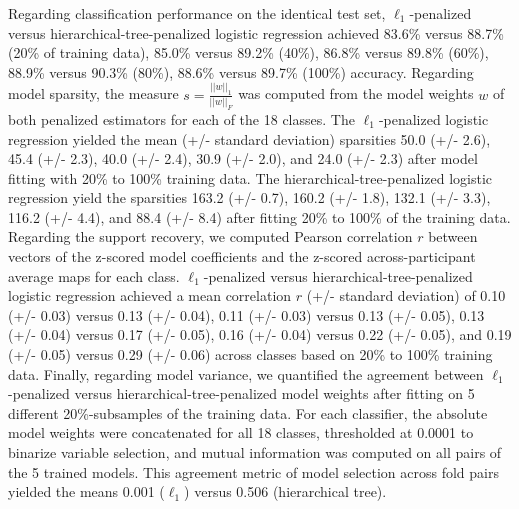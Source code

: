 \documentclass[runningheads,a4paper]{llncs}
\begin{document}
%
Regarding classification performance on the identical test set,
$\ell_1$-penalized versus hierarchical-tree-penalized logistic regression
achieved
83.6\% versus 88.7\% (20\% of training data),
85.0\% versus 89.2\% (40\%),
86.8\% versus 89.8\% (60\%),
88.9\% versus 90.3\% (80\%),
88.6\% versus 89.7\% (100\%) accuracy.
%
Regarding model sparsity,
the measure $s = \frac{||w||_1}{||w||_F}$ was computed from
the model weights $w$ of both penalized estimators
for each of the 18 classes.
The $\ell_1$-penalized logistic regression
yielded the mean (+/- standard deviation) sparsities
50.0 (+/- 2.6), 45.4 (+/- 2.3), 40.0 (+/- 2.4), 30.9 (+/- 2.0), and 24.0 (+/- 2.3)
after model fitting with 20\% to 100\% training data.
The hierarchical-tree-penalized logistic regression
yield the sparsities
163.2 (+/- 0.7), 160.2 (+/- 1.8), 132.1 (+/- 3.3), 116.2 (+/- 4.4), and 88.4 (+/- 8.4)
after fitting 20\% to 100\% of the training data.
Regarding the support recovery, we computed
Pearson correlation $r$ between vectors of
the z-scored model coefficients
and
the z-scored across-participant average maps for each class.
$\ell_1$-penalized versus hierarchical-tree-penalized logistic regression
achieved a mean correlation $r$ (+/- standard deviation) of
0.10 (+/- 0.03) versus 0.13 (+/- 0.04),
0.11 (+/- 0.03) versus 0.13 (+/- 0.05),
0.13 (+/- 0.04) versus 0.17 (+/- 0.05),
0.16 (+/- 0.04) versus 0.22 (+/- 0.05), and
0.19 (+/- 0.05) versus 0.29 (+/- 0.06) across classes
based on 20\% to 100\% training data.
Finally, regarding model variance,
we quantified the agreement between
$\ell_1$-penalized versus hierarchical-tree-penalized
model weights after fitting
on 5 different 20\%-subsamples of the training data.
For each classifier,
the absolute model weights were concatenated for all 18 classes,
thresholded at 0.0001 to binarize variable selection,
and mutual information was computed on all pairs
of the 5 trained models.
This agreement metric of model selection across fold pairs
yielded the means 0.001 ($\ell_1$) versus 0.506 (hierarchical tree).
\end{document}
